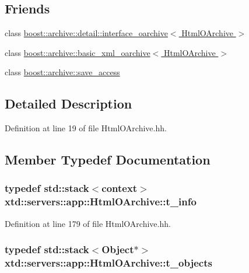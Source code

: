 \subsection*{Friends}
\begin{DoxyCompactItemize}
\item 
class \hyperlink{classxtd_1_1servers_1_1app_1_1HtmlOArchive_a725f48824bde766dcd0e8049b4df3df0}{boost\-::archive\-::detail\-::interface\-\_\-oarchive$<$ Html\-O\-Archive $>$}
\item 
class \hyperlink{classxtd_1_1servers_1_1app_1_1HtmlOArchive_a350c2afaed5c679f01f1b4e36a6ad91f}{boost\-::archive\-::basic\-\_\-xml\-\_\-oarchive$<$ Html\-O\-Archive $>$}
\item 
class \hyperlink{classxtd_1_1servers_1_1app_1_1HtmlOArchive_aaca003bb8a4fc59424e4025130da4edd}{boost\-::archive\-::save\-\_\-access}
\end{DoxyCompactItemize}


\subsection{Detailed Description}


Definition at line 19 of file Html\-O\-Archive.\-hh.



\subsection{Member Typedef Documentation}
\hypertarget{classxtd_1_1servers_1_1app_1_1HtmlOArchive_aedb461454d0c255709664fcccc379cf5}{
\subsubsection[{t\-\_\-info}]{\setlength{\rightskip}{0pt plus 5cm}typedef std\-::stack$<$context$>$ {\bf xtd\-::servers\-::app\-::\-Html\-O\-Archive\-::t\-\_\-info}}}\label{classxtd_1_1servers_1_1app_1_1HtmlOArchive_aedb461454d0c255709664fcccc379cf5}


Definition at line 179 of file Html\-O\-Archive.\-hh.

\hypertarget{classxtd_1_1servers_1_1app_1_1HtmlOArchive_a0409a4336819121b7ec0d402ffca9cdf}{
\subsubsection[{t\-\_\-objects}]{\setlength{\rightskip}{0pt plus 5cm}typedef std\-::stack$<$Object$\ast$$>$ {\bf xtd\-::servers\-::app\-::\-Html\-O\-Archive\-::t\-\_\-objects}}}\label{classxtd_1_1servers_1_1app_1_1HtmlOArchive_a0409a4336819121b7ec0d402ffca9cdf}



